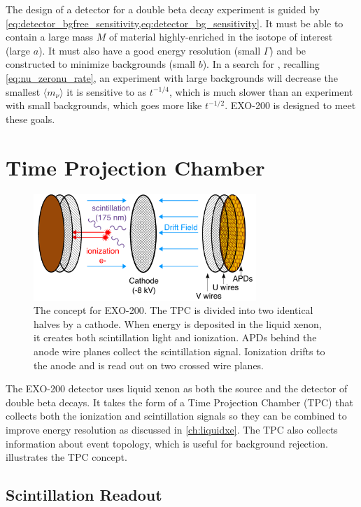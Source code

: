 \documentclass[herrin-thesis.tex]{subfiles}
\begin{document}
The design of a detector for a double beta decay experiment is guided by \cref{eq:detector_bgfree_sensitivity,eq:detector_bg_sensitivity}. It must be able to contain a large mass \(M\) of material highly-enriched in the isotope of interest (large \(a\)). It must also have a good energy resolution (small \(\Gamma\)) and be constructed to minimize backgrounds (small \(b\)). In a search for \zeronu{}, recalling \cref{eq:nu_zeronu_rate}, an experiment with large backgrounds will decrease the smallest  \(\langle m_{\nu} \rangle\) it is sensitive to as \(t^{-1/4}\), which is much slower than an experiment with small backgrounds, which goes more like \(t^{-1/2}\). EXO-200 is designed to meet these goals.

\section{Time Projection Chamber}
\begin{figure}[htbp]
\centering
\includegraphics[width=0.75\textwidth]{./figures/detector_tpc_schematic.pdf}
\caption[A conceptual drawing of EXO-200]{The concept for EXO-200. The TPC is divided into two identical halves by a cathode. When energy is deposited in the liquid xenon, it creates both scintillation light and ionization. APDs behind the anode wire planes collect the scintillation signal. Ionization drifts to the anode and is read out on two crossed wire planes.}
\label{fig:detector_tpc_cartoon}
\end{figure}
The EXO-200 detector uses liquid xenon as both the source and the detector of double beta decays. It takes the form of a Time Projection Chamber (TPC) that collects both the ionization and scintillation signals so they can be combined to improve energy resolution as discussed in \cref{ch:liquidxe}. The TPC also collects information about event topology, which is useful for background rejection.  illustrates the TPC concept.

\subsection{Scintillation Readout}
\end{document}
